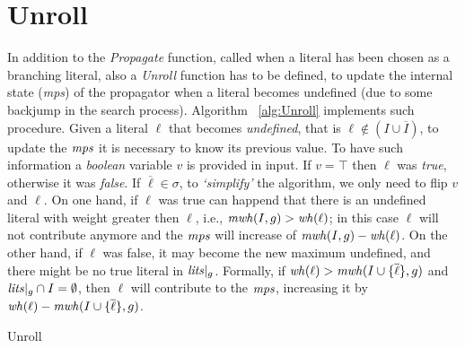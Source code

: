 \section{Unroll}
In addition to the \textit{Propagate} function, called when a literal has been chosen as a branching literal,
also a \textit{Unroll} function has to be defined, to update the internal state (\textit{mps}) of the propagator when a literal 
becomes undefined (due to some backjump in the search process).
Algorithm ~\ref{alg:Unroll} implements such procedure.
Given a literal $\ell$ that becomes \textit{undefined}, that is $\ell \not\in (I \cup \overline{I})$,
to update the $\mathit{mps}$ it is necessary to know its previous value.
To have such information a \textit{boolean} variable $v$ is provided in input.
If $v = \top$ then $\ell$ was \textit{true}, otherwise it was \textit{false}.
If $\overline{\ell} \in \sigma$, to \textit{`simplify'} the algorithm, we only need to flip $v$ and $\ell$.
On one hand, if $\ell$ was true can happend that there is an undefined literal
with weight greater then $\ell$, i.e., $\mathit{mwh}(I,g) > \mathit{wh}(\ell)$;
in this case $\ell$ will not contribute anymore and 
the $\mathit{mps}$ will increase of $\mathit{mwh}(I,g) - \mathit{wh}(\ell)$.
On the other hand, if $\ell$ was false, it may become the new maximum undefined,
and there might be no true literal in $\mathit{lits}|_g$. 
Formally, if $\mathit{wh}(\ell) > \mathit{mwh}(I \cup \{\overline{\ell}\}, g)$ and $\mathit{lits}|_g \cap I = \emptyset$, 
then $\ell$ will contribute to the $\mathit{mps}$,
increasing it by $\mathit{wh}(\ell) - \mathit{mwh}(I \cup \{\overline{\ell}\}, g)$.

\begin{algorithm}[H]\small
    \caption{Unroll}
    \label{alg:Unroll}
\end{algorithm}